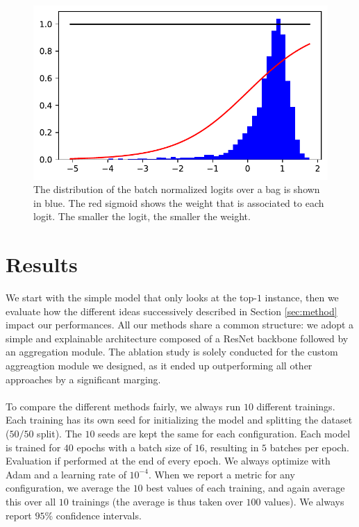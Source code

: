 \documentclass[final]{cvpr}
\begin{document}
	\begin{figure}[h!]
		\begin{center}
			\includegraphics[width=0.95\linewidth]{fig/aggreg_2.pdf}
		\end{center}
		\caption{The distribution of the batch normalized logits over a bag is shown in blue. The red sigmoid shows the weight that is associated to each logit. The smaller the logit, the smaller the weight.}
		\label{fig:aggreg}
	\end{figure}

	\section{Results}
	
	We start with the simple model that only looks at the top-$1$ instance, then we evaluate how the different ideas successively described in Section \ref{sec:method} impact our performances. All our methods share a common structure: we adopt a simple and explainable architecture composed of a ResNet \cite{resnet} backbone followed by an aggregation module. The ablation study is solely conducted for the custom aggreagtion module we designed, as it ended up outperforming all other approaches by a significant marging.\\
	\\
	To compare the different methods fairly, we always run $10$ different trainings. Each training has its own seed for initializing the model and splitting the dataset ($50/50$ split). The $10$ seeds are kept the same for each configuration. Each model is trained for $40$ epochs with a batch size of $16$, resulting in $5$ batches per epoch. Evaluation if performed at the end of every epoch. We always optimize with Adam and a learning rate of $10^{-4}$. When we report a metric for any configuration, we average the $10$ best values of each training, and again average this over all $10$ trainings (the average is thus taken over $100$ values). We always report $95\%$ confidence intervals.
\end{document}
